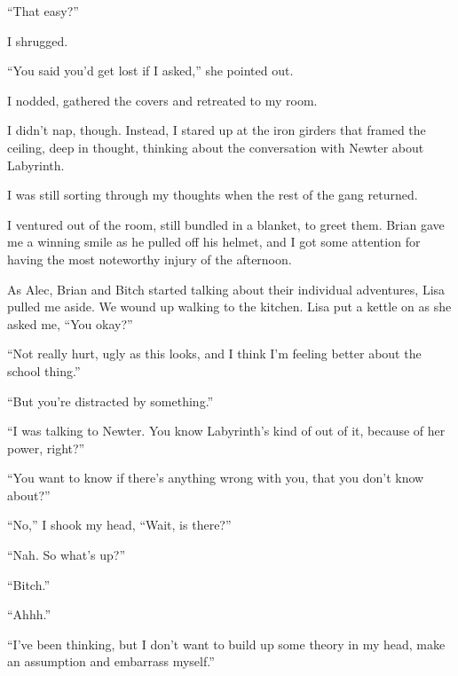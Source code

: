 ``That easy?''



I shrugged.



``You said you'd get lost if I asked,'' she pointed out.



I nodded, gathered the covers and retreated to my room.



I didn't nap, though.  Instead, I stared up at the iron girders that framed the ceiling, deep in thought, thinking about the conversation with Newter about Labyrinth.



I was still sorting through my thoughts when the rest of the gang returned.



I ventured out of the room, still bundled in a blanket, to greet them.  Brian gave me a winning smile as he pulled off his helmet, and I got some attention for having the most noteworthy injury of the afternoon.



As Alec, Brian and Bitch started talking about their individual adventures, Lisa pulled me aside.  We wound up walking to the kitchen.  Lisa put a kettle on as she asked me, ``You okay?''



``Not really hurt, ugly as this looks, and I think I'm feeling better about the school thing.''



``But you're distracted by something.''



``I was talking to Newter.  You know Labyrinth's kind of out of it, because of her power, right?''



``You want to know if there's anything wrong with you, that you don't know about?''



``No,'' I shook my head, ``Wait, is there?''



``Nah.  So what's up?''



``Bitch.''



``Ahhh.''



``I've been thinking, but I don't want to build up some theory in my head, make an assumption and embarrass myself.''



